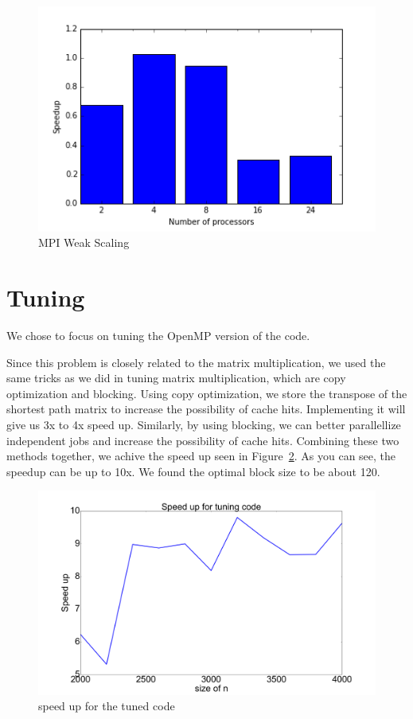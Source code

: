 \documentclass[11pt]{article}
\begin{document}
\begin{figure}
\caption{MPI Weak Scaling}
\label{mpi-weak-scaling}
\includegraphics{../results/mpi_weak.png}
\end{figure}

\section*{Tuning}
    We chose to focus on tuning the OpenMP version of the code.\newline

    Since this problem is closely related to the matrix multiplication, we used the same tricks as we did in tuning matrix multiplication, which are copy optimization and blocking. Using copy optimization, we store the transpose of the shortest path matrix to increase the possibility of cache hits. Implementing it will give us 3x to 4x speed up. Similarly, by using blocking, we can better parallellize independent jobs and increase the possibility of cache hits. Combining these two methods together, we achive the speed up seen in Figure~\ref{su}. As you can see, the speedup can be up to 10x. We found the optimal block size to be about 120.\newline

    \begin{figure}
    \caption{speed up for the tuned code}
    \label{su}
    \includegraphics[height=0.4\textwidth, width=\textwidth]{speed_up.png}
    \end{figure}
\end{document}
